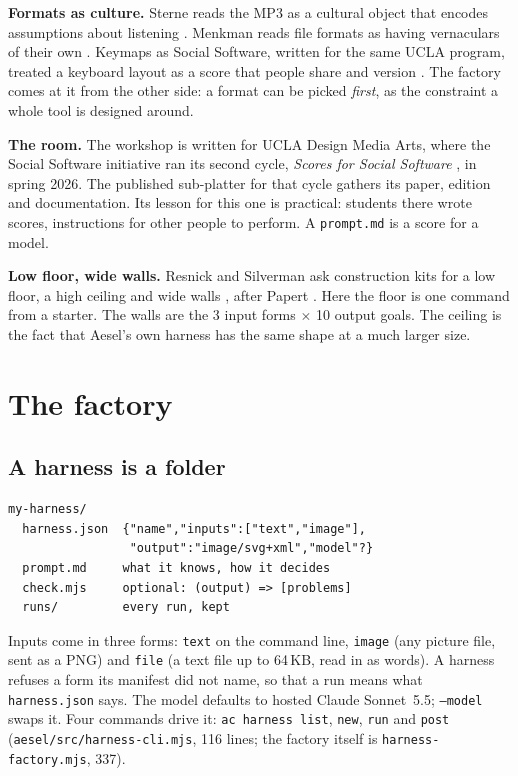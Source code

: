 \documentclass[10pt,letterpaper,twocolumn]{article}
\newcommand{\code}[1]{\texttt{#1}}
\begin{document}
\textbf{Formats as culture.} Sterne reads the MP3 as a cultural object that
encodes assumptions about listening \citep{sterne2012mp3}. Menkman reads file
formats as having vernaculars of their own \citep{menkman2010vernacular}.
Keymaps as Social Software, written for the same UCLA program, treated a
keyboard layout as a score that people share and version \citep{scudder2026keymaps}.
The factory comes at it from the other side: a format can be picked
\emph{first}, as the constraint a whole tool is designed around.

\textbf{The room.} The workshop is written for UCLA Design Media Arts, where
the Social Software initiative \citep{sosoft_info} ran its second cycle,
\emph{Scores for Social Software} \citep{reas2026scores}, in spring 2026.
The published sub-platter for that cycle \citep{sosoftplatter} gathers its
paper, edition and documentation. Its lesson for this one is practical:
students there wrote scores, instructions for other people to perform. A
\code{prompt.md} is a score for a model.

\textbf{Low floor, wide walls.} Resnick and Silverman ask construction kits
for a low floor, a high ceiling and wide walls \citep{resnick2005reflections},
after Papert \citep{papert1980mindstorms}. Here the floor is one command
from a starter. The walls are the 3 input forms $\times$ 10 output goals.
The ceiling is the fact that Aesel's own harness has the same shape at a much
larger size.

\section{The factory}
\label{sec:factory}

\subsection{A harness is a folder}
\begin{Verbatim}
my-harness/
  harness.json  {"name","inputs":["text","image"],
                 "output":"image/svg+xml","model"?}
  prompt.md     what it knows, how it decides
  check.mjs     optional: (output) => [problems]
  runs/         every run, kept
\end{Verbatim}
Inputs come in three forms: \code{text} on the command line, \code{image}
(any picture file, sent as a PNG) and \code{file} (a text file up to 64\,KB,
read in as words). A harness refuses a form its manifest did not name, so
that a run means what \code{harness.json} says. The model defaults to
hosted Claude Sonnet~5.5; \code{--model} swaps it. Four commands drive it:
\code{ac harness list}, \code{new}, \code{run} and \code{post}
(\code{aesel/src/harness-cli.mjs}, 116 lines; the factory itself is
\code{harness-factory.mjs}, 337).
\end{document}
